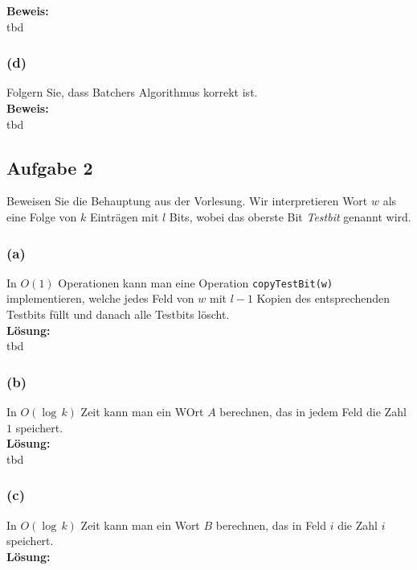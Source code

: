 \documentclass[11pt,a4paper,ngerman]{article}
\begin{document}
\noindent\textbf{Beweis:}\\

tbd

\subsubsection*{(d)}
Folgern Sie, dass Batchers Algorithmus korrekt ist.\\

\noindent\textbf{Beweis:}\\

tbd



\subsection*{Aufgabe 2}
Beweisen Sie die Behauptung aus der Vorlesung. Wir interpretieren Wort $w$ als eine Folge von $k$ Einträgen mit $l$ Bits, wobei das oberste Bit \emph{Testbit} genannt wird.

\subsubsection*{(a)}
In $O(1)$ Operationen kann man eine Operation \lstinline|copyTestBit(w)| implementieren, welche jedes Feld von $w$ mit $l-1$ Kopien des entsprechenden Testbits füllt und danach alle Testbits löscht.\\

\noindent\textbf{Lösung:}\\

tbd

\subsubsection*{(b)}
In $O(\log \, k)$ Zeit kann man ein WOrt $A$ berechnen, das in jedem Feld die Zahl $1$ speichert.\\

\noindent\textbf{Lösung:}\\

tbd

\subsubsection*{(c)}
In $O(\log \, k)$ Zeit kann man ein Wort $B$ berechnen, das in Feld $i$ die Zahl $i$ speichert.\\

\noindent\textbf{Lösung:}\\
\end{document}
